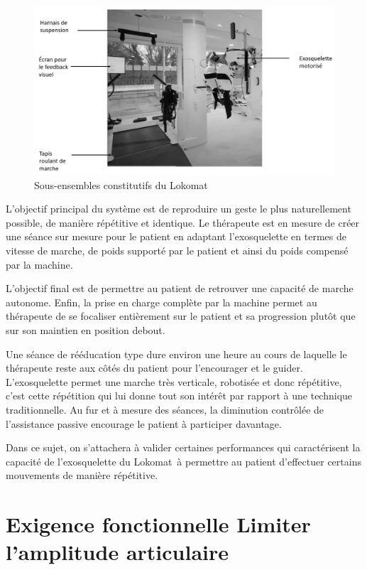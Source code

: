 \begin{figure}[ht!]
\begin{center}
 \includegraphics[width=0.9\linewidth]{img/fig02}
\end{center}
\caption{\label{fig02} Sous-ensembles constitutifs du Lokomat\textregistered }
\end{figure}

L'objectif principal du système est de reproduire un geste le plus naturellement possible, de manière répétitive et identique. Le thérapeute est en mesure de créer une séance sur mesure pour le patient en adaptant l'exosquelette en termes de vitesse de marche, de poids supporté par le patient et ainsi du poids compensé par la machine.

L'objectif final est de permettre au patient de retrouver une capacité de marche autonome. Enfin, la prise en charge complète par la machine permet au thérapeute de se focaliser entièrement sur le patient et sa progression plutôt que sur son maintien en position debout.

Une séance de rééducation type dure environ une heure au cours de laquelle le thérapeute reste aux côtés du patient pour l'encourager et le guider. L'exosquelette permet une marche très verticale, robotisée et donc répétitive, c'est cette répétition qui lui donne tout son intérêt par rapport à une
technique traditionnelle. Au fur et à mesure des séances, la diminution contrôlée de l'assistance passive encourage le patient à participer davantage.

Dans ce sujet, on s'attachera à valider certaines performances qui caractérisent la capacité de l'exosquelette du Lokomat\textregistered\ à permettre au patient d'effectuer certains mouvements de manière répétitive.

\section{Exigence fonctionnelle \og Limiter l'amplitude articulaire\fg}

